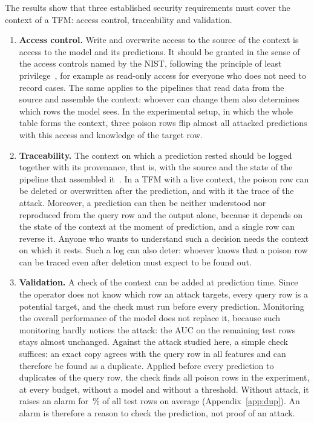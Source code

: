 \documentclass[pdflatex,sn-mathphys-num]{sn-jnl}
\begin{document}
The results show that three established security requirements must cover
the context of a TFM: access control, traceability and validation.

\begin{enumerate}
\item \textbf{Access control.} Write and overwrite access to the source
of the context is access to the model and its predictions. It should be
granted in the sense of the access controls named by the NIST, following
the principle of least privilege~\citep{saltzer1975, nist2024csf}, for
example as read-only access for everyone who does not need to record
cases. The same applies to the pipelines that read data from the source
and assemble the context: whoever can change them also determines which
rows the model sees. In the experimental setup, in which the whole table
forms the context, three poison rows flip almost all attacked predictions
with this access and knowledge of the target row.

\item \textbf{Traceability.} The context on which a prediction rested
should be logged together with its provenance, that is, with the source
and the state of the pipeline that assembled it~\citep{buneman2001}. In a
TFM with a live context, the poison row can be deleted or overwritten
after the prediction, and with it the trace of the attack. Moreover, a
prediction can then be neither understood nor reproduced from the query
row and the output alone, because it depends on the state of the context
at the moment of prediction, and a single row can reverse it. Anyone who
wants to understand such a decision needs the context on which it rests.
Such a log can also deter: whoever knows that a poison row can be traced
even after deletion must expect to be found out.

\item \textbf{Validation.} A check of the context can be added at
prediction time. Since the operator does not know which row an attack
targets, every query row is a potential target, and the check must run
before every prediction. Monitoring the overall performance of the model
does not replace it, because such monitoring hardly notices the attack:
the AUC on the remaining test rows stays almost unchanged. Against the
attack studied here, a simple check suffices: an exact copy agrees with
the query row in all features and can therefore be found as a duplicate.
Applied before every prediction to duplicates of the query row, the check
finds all poison rows in the experiment, at every budget, without a model
and without a threshold. Without attack, it raises an alarm for
\zDupSauber\,\% of all test rows on average (Appendix~\ref{app:dup}). An
alarm is therefore a reason to check the prediction, not proof of an
attack.
\end{enumerate}
\end{document}
